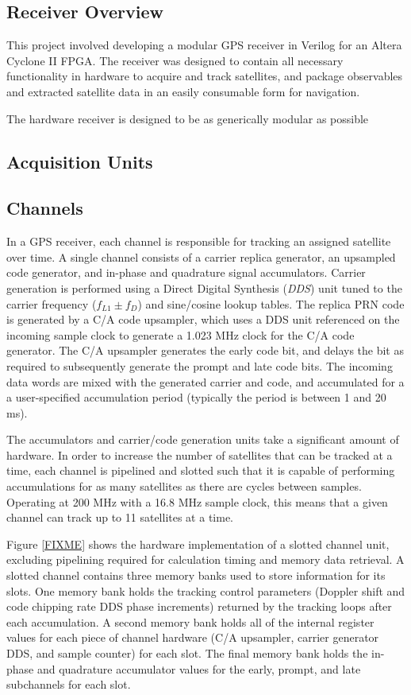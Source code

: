 \documentclass[12pt]{article}
\begin{document}
\subsection{Receiver Overview}
This project involved developing a modular GPS receiver in Verilog for an Altera Cyclone II FPGA. The receiver was designed to contain all necessary functionality in hardware to acquire and track satellites, and package observables and extracted satellite data in an easily consumable form for navigation.

The hardware receiver is designed to be as generically modular as possible

\subsection{Acquisition Units}

\subsection{Channels}
In a GPS receiver, each channel is responsible for tracking an assigned satellite over time. A single channel consists of a carrier replica generator, an upsampled code generator, and in-phase and quadrature signal accumulators. Carrier generation is performed using a Direct Digital Synthesis (\emph{DDS}) unit tuned to the carrier frequency ($f_{L1} \pm f_D$) and sine/cosine lookup tables. The replica PRN code is generated by a C/A code upsampler, which uses a DDS unit referenced on the incoming sample clock to generate a 1.023 MHz clock for the C/A code generator. The C/A upsampler generates the early code bit, and delays the bit as required to subsequently generate the prompt and late code bits. The incoming data words are mixed with the generated carrier and code, and accumulated for a a user-specified accumulation period (typically the period is between 1 and 20 ms).

The accumulators and carrier/code generation units take a significant amount of hardware. In order to increase the number of satellites that can be tracked at a time, each channel is pipelined and slotted such that it is capable of performing accumulations for as many satellites as there are cycles between samples. Operating at 200 MHz with a 16.8 MHz sample clock, this means that a given channel can track up to 11 satellites at a time.


Figure \ref{FIXME} shows the hardware implementation of a slotted channel unit, excluding pipelining required for calculation timing and memory data retrieval. A slotted channel contains three memory banks used to store information for its slots. One memory bank holds the tracking control parameters (Doppler shift and code chipping rate DDS phase increments) returned by the tracking loops after each accumulation. A second memory bank holds all of the internal register values for each piece of channel hardware (C/A upsampler, carrier generator DDS, and sample counter) for each slot. The final memory bank holds the in-phase and quadrature accumulator values for the early, prompt, and late subchannels for each slot.
\end{document}
